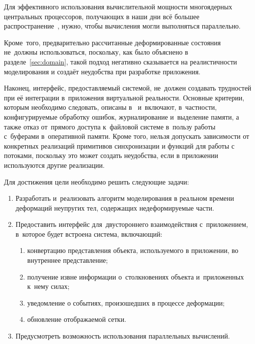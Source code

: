 \documentclass[a4paper, 14pt, titlepage]{extarticle}
\begin{document}
    Для эффективного использования вычислительной мощности многоядерных центральных процессоров,
    получающих в наши дни всё большее распространение~\cite{steam-hardware}, нужно, чтобы вычисления могли
    выполняться параллельно.

    Кроме~того, предварительно рассчитанные деформированные состояния не~должны использоваться,
    поскольку, как было объяснено в разделе~\ref{sec:domain}, такой подход негативно сказывается на реалистичности
    моделирования и создаёт неудобства при разработке приложения.

    Наконец, интерфейс, предоставляемый системой, не~должен создавать трудностей при её интеграции
    в~приложения виртуальной реальности. Основные критерии, которым необходимо следовать,
    описаны в~\cite{gems-middleware} и~включают, в~частности, конфигурируемые обработку ошибок,
    журналирование и~выделение памяти, а также отказ от~прямого доступа к~файловой системе в~пользу
    работы с~буферами в~оперативной памяти. Кроме того, нельзя допускать зависимости от конкретных
    реализаций примитивов синхронизации и функций для работы с потоками, поскольку это может создать
    неудобства, если в приложении используются другие реализации.

    Для достижения цели необходимо решить следующие задачи:
    \begin{enumerate}
      \item Разработать и~реализовать алгоритм моделирования в реальном времени деформаций
        не\-у\-пру\-гих тел, содержащих недеформируемые части.
      \item Предоставить интерфейс для~двустороннего взаимодействия с~приложением, в~которое будет
        встроена система, включающий:
        \begin{enumerate}
          \item конвертацию представления объекта, используемого в приложении, во внутреннее представление;
          \item получение извне информации о~столкновениях объекта и~приложенных к~нему силах;
          \item уведомление о событиях, произошедших в процессе деформации;
          \item обновление отображаемой сетки.
        \end{enumerate}
      \item Предусмотреть возможность использования параллельных вычислений.
    \end{enumerate}
\end{document}
